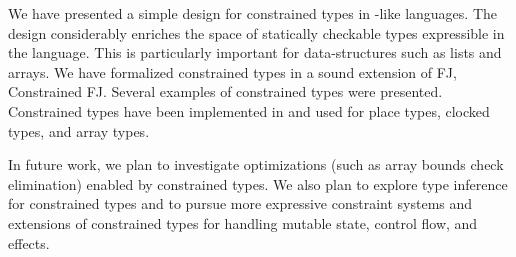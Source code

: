 %
%
%
%

We have presented a simple design for constrained types
in \java-like languages. The design considerably enriches the space of
statically checkable types expressible in the language. This is
particularly important for data-structures such as lists and arrays.
We have formalized constrained types in a sound extension of FJ,
Constrained FJ.
Several examples of constrained types were presented.
Constrained types have been implemented in \Xten{}
and used for place types, clocked types, and array types.

In future work,
we plan to investigate
optimizations (such as array
bounds check elimination) enabled by constrained types.
We also plan to explore type inference for constrained types
and to pursue more expressive constraint systems and
extensions of constrained types for handling mutable state,
control flow, and effects.
